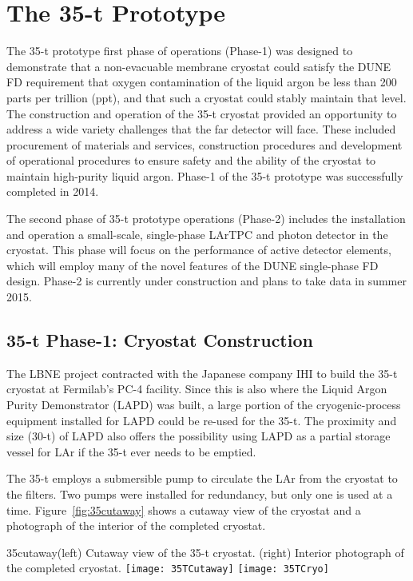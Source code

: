 \section{The 35-t Prototype} 
\label{sec:proto-35t}

The 35-t prototype first phase of operations (Phase-1) was designed
to demonstrate that a non-evacuable membrane cryostat could satisfy
the DUNE FD requirement that oxygen contamination of the liquid argon
be less than 200 parts per trillion (ppt), and that such a cryostat
could stably maintain that level.  The construction and operation of
the 35-t cryostat provided an opportunity to address a wide variety
challenges that the far detector will face.  These included
procurement of materials and services, construction procedures and
development of operational procedures to ensure safety and the ability
of the cryostat to maintain high-purity liquid argon.  Phase-1 of the
35-t prototype was successfully completed in 2014.

The second phase of 35-t prototype operations (Phase-2) includes the
installation and operation a small-scale, single-phase LArTPC and
photon detector in the cryostat.  This phase will focus on the
performance of active detector elements, which will employ many of the
novel features of the DUNE single-phase FD design.  Phase-2 is
currently under construction and plans to take data in summer
2015.

\subsection{35-t Phase-1: Cryostat Construction}

The LBNE project contracted with the Japanese company IHI\cite{bib:ihicorp}
to build the 35-t cryostat at Fermilab's PC-4 facility.
Since this is also where the Liquid Argon Purity Demonstrator (LAPD)\cite{bib:lapdP07005}
was built, a large portion of the cryogenic-process 
equipment installed for LAPD could be re-used for the 35-t.
The proximity and size (30-t) of LAPD also offers the possibility using LAPD as 
a partial storage vessel for LAr if the 35-t ever needs to be emptied.

The 35-t employs a submersible pump to circulate the LAr from the
cryostat to the filters.  Two pumps were installed for redundancy, but
only one is used at a time.  Figure~\ref{fig:35cutaway} shows a
cutaway view of the cryostat and a photograph of the interior of the
completed cryostat.
\begin{cdrfigure}{35cutaway}{(left) Cutaway view of the 35-t cryostat. (right) Interior
photograph of the completed cryostat.}
\texttt{[image: 35TCutaway]}
\texttt{[image: 35TCryo]}
\end{cdrfigure}

